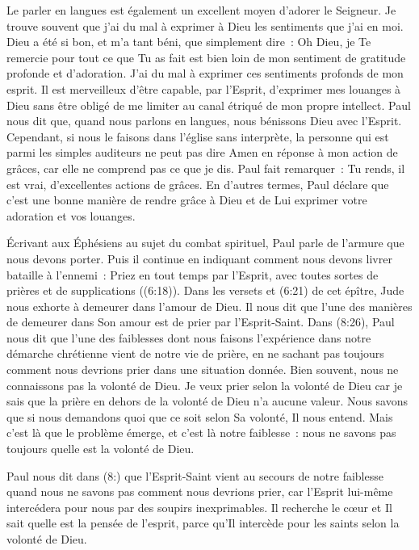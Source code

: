 Le parler en langues est également un excellent moyen d'adorer le Seigneur.
 Je trouve souvent que j'ai du mal à exprimer à Dieu les sentiments
 que j'ai en moi. Dieu a été si bon, et m'a tant béni, que simplement dire~:
 \og Oh Dieu, je Te remercie pour tout ce que Tu as fait \fg{}
 est bien loin de mon sentiment de gratitude profonde et d'adoration.
 J'ai du mal à exprimer ces sentiments profonds de mon esprit.
 Il est merveilleux d'être capable, par l'Esprit, d'exprimer mes louanges
 à Dieu sans être obligé de me limiter au canal étriqué
 de mon propre intellect. Paul nous dit que, quand nous parlons en langues,
 nous bénissons Dieu avec l'Esprit. Cependant, si nous le faisons
 dans l'église sans interprète, la personne qui est parmi les simples auditeurs
 ne peut pas dire \og Amen \fg{} en réponse à mon action de grâces,
 car elle ne comprend pas ce que je dis. Paul fait remarquer~:
 \og Tu rends, il est vrai, d'excellentes actions de grâces. \fg{}
 En d'autres termes, Paul déclare que c'est une bonne manière
 de rendre grâce à Dieu et de Lui exprimer votre adoration et vos louanges.

Écrivant aux Éphésiens au sujet du combat spirituel, Paul parle de l'armure
 que nous devons porter. Puis il continue en indiquant comment
 nous devons livrer bataille à l'ennemi~:
 \og Priez en tout temps par l'Esprit, avec toutes sortes de prières
 et de supplications \fg{} ((6:18)).
 Dans les versets  et (6:21) de cet épître,
 Jude nous exhorte à demeurer dans l'amour de Dieu.
 Il nous dit que l'une des manières de demeurer dans Son amour est de prier
 par l'Esprit-Saint. Dans (8:26), Paul nous dit que l'une
 des faiblesses dont nous faisons l'expérience dans notre démarche
 chrétienne vient de notre vie de prière, en ne sachant pas toujours
 comment nous devrions prier dans une situation donnée.
 Bien souvent, nous ne connaissons pas la volonté de Dieu.
 Je veux prier selon la volonté de Dieu car je sais que la prière en dehors
 de la volonté de Dieu n'a aucune valeur. Nous savons que si nous demandons
 quoi que ce soit selon Sa volonté, Il nous entend.
 Mais c'est là que le problème émerge, et c'est là notre faiblesse~:
 nous ne savons pas toujours quelle est la volonté de Dieu.

Paul nous dit dans (8:) que l'Esprit-Saint vient au secours
 de notre faiblesse quand nous ne savons pas comment nous devrions prier,
 car l'Esprit lui-même intercédera pour nous par des soupirs inexprimables.
 Il recherche le cœur et Il sait quelle est la pensée de l'esprit,
 parce qu'Il intercède pour les saints selon la volonté de Dieu.

